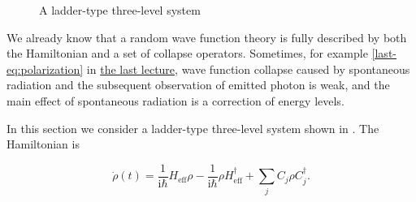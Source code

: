 \documentclass[hyperref, a4paper]{article}
\newcommand*{\ii}{\mathrm{i}}
\newcommand{\lastnote}{\href{12-2.pdf}{the last lecture}}
\begin{document}
\begin{figure}
    \centering
    
    \caption{A ladder-type three-level system}
    \label{fig:ladder-system}
\end{figure}

We already know that a random wave function theory is fully described by both the Hamiltonian and a set 
of collapse operators. Sometimes, for example \eqref{last-eq:polarization} in \lastnote, wave function collapse
caused by spontaneous radiation and the subsequent observation of emitted photon is weak, and the main 
effect of spontaneous radiation is a correction of energy levels.

In this section we consider a ladder-type three-level system shown in .
The Hamiltonian is 

\begin{equation}
    \dot{\rho}(t) = \frac{1}{\ii \hbar} H_\text{eff} \rho - \frac{1}{\ii \hbar} \rho H_\text{eff}^\dagger + \sum_j C_j \rho C_j^\dagger.
\end{equation}
\end{document}
